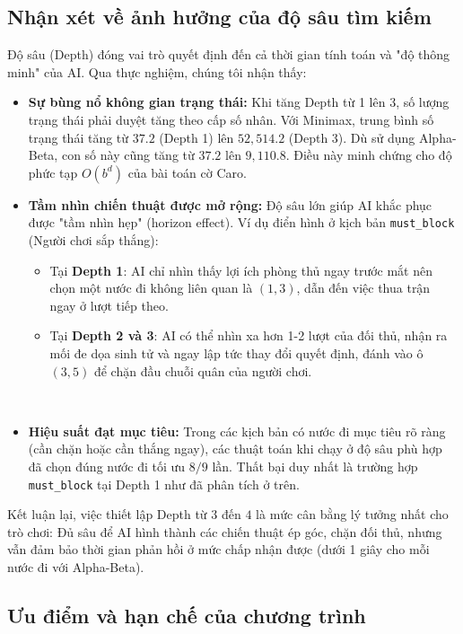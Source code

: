 \documentclass[12pt,a4paper]{article}
\begin{document}
\subsection{Nhận xét về ảnh hưởng của độ sâu tìm kiếm}

Độ sâu (Depth) đóng vai trò quyết định đến cả thời gian tính toán và "độ thông minh" của AI. Qua thực nghiệm, chúng tôi nhận thấy:

\begin{itemize}
    \item \textbf{Sự bùng nổ không gian trạng thái:} Khi tăng Depth từ 1 lên 3, số lượng trạng thái phải duyệt tăng theo cấp số nhân. Với Minimax, trung bình số trạng thái tăng từ $37.2$ (Depth 1) lên $52,514.2$ (Depth 3). Dù sử dụng Alpha-Beta, con số này cũng tăng từ $37.2$ lên $9,110.8$. Điều này minh chứng cho độ phức tạp $O(b^d)$ của bài toán cờ Caro.
    \item \textbf{Tầm nhìn chiến thuật được mở rộng:} Độ sâu lớn giúp AI khắc phục được "tầm nhìn hẹp" (horizon effect). Ví dụ điển hình ở kịch bản \texttt{must\_block} (Người chơi sắp thắng):
    \begin{itemize}
        \item Tại \textbf{Depth 1}: AI chỉ nhìn thấy lợi ích phòng thủ ngay trước mắt nên chọn một nước đi không liên quan là $(1,3)$, dẫn đến việc thua trận ngay ở lượt tiếp theo.
        \item Tại \textbf{Depth 2 và 3}: AI có thể nhìn xa hơn 1-2 lượt của đối thủ, nhận ra mối đe dọa sinh tử và ngay lập tức thay đổi quyết định, đánh vào ô $(3,5)$ để chặn đầu chuỗi quân của người chơi.
    \end{itemize}
    \item \textbf{Hiệu suất đạt mục tiêu:} Trong các kịch bản có nước đi mục tiêu rõ ràng (cần chặn hoặc cần thắng ngay), các thuật toán khi chạy ở độ sâu phù hợp đã chọn đúng nước đi tối ưu $8/9$ lần. Thất bại duy nhất là trường hợp \texttt{must\_block} tại Depth 1 như đã phân tích ở trên.
\end{itemize}

Kết luận lại, việc thiết lập Depth từ $3$ đến $4$ là mức cân bằng lý tưởng nhất cho trò chơi: Đủ sâu để AI hình thành các chiến thuật ép góc, chặn đối thủ, nhưng vẫn đảm bảo thời gian phản hồi ở mức chấp nhận được (dưới 1 giây cho mỗi nước đi với Alpha-Beta).
\subsection{Ưu điểm và hạn chế của chương trình}
\end{document}
